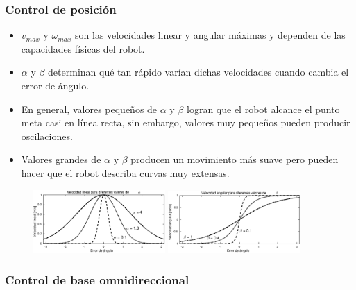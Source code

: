 \begin{frame}\frametitle{Control de posición}
  \begin{itemize}
  \item $v_{max}$ y $\omega_{max}$ son las velocidades linear y angular máximas y dependen de las capacidades físicas del robot.
  \item $\alpha$ y $\beta$ determinan qué tan rápido varían dichas velocidades cuando cambia el error de ángulo.
  \item En general, valores pequeños de $\alpha$ y $\beta$ logran que el robot alcance el punto meta casi en línea recta, sin embargo, valores muy pequeños pueden producir oscilaciones.
  \item Valores grandes de $\alpha$ y $\beta$ producen un movimiento más suave pero pueden hacer que el robot describa curvas muy extensas. 
  \end{itemize}
  \begin{figure}
    \centering
    \includegraphics[width=0.45\textwidth]{Figures/LinearSpeed.eps}
    \includegraphics[width=0.45\textwidth]{Figures/AngularSpeed.eps}
  \end{figure}
\end{frame}

\begin{frame}\frametitle{Control de base omnidireccional}
\end{frame}

